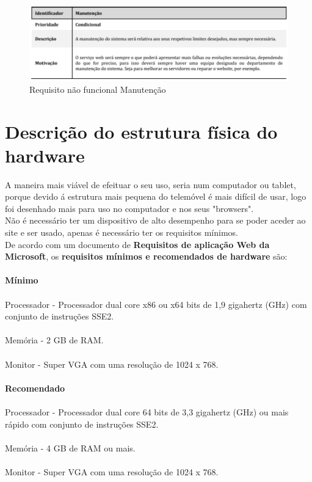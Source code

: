 \begin{figure}[H]
	\centering
	\includegraphics[width=15cm]{requisito_nao_funcional6}
	\caption{Requisito não funcional Manutenção}
	\label{fig:requisitonaofuncional6}
\end{figure}

\section{Descrição do estrutura física do hardware}
A maneira mais viável de efeituar o seu uso, seria num computador ou tablet, porque devido á estrutura mais pequena do telemóvel é mais difícil de usar, logo foi desenhado mais para uso no computador e nos seus "browsers". \\
Não é necessário ter um dispositivo de alto desempenho para se poder aceder ao site e ser usado, apenas é necessário ter os requisitos mínimos.\\
De acordo com um documento de \textbf{Requisitos de aplicação Web da Microsoft}, os \textbf{requisitos mínimos e recomendados de hardware} são:\\
\\ \textbf{Mínimo}\\
\\Processador - Processador dual core x86 ou x64 bits de 1,9 gigahertz (GHz) com conjunto de instruções SSE2.\\
\\Memória - 2 GB de RAM. \\
\\Monitor - Super VGA com uma resolução de 1024 x 768. \\
\\ \textbf{Recomendado}\\
\\Processador - Processador dual core 64 bits de 3,3 gigahertz (GHz) ou mais rápido com conjunto de instruções SSE2.\\
\\Memória - 4 GB de RAM ou mais.\\
\\Monitor - 	Super VGA com uma resolução de 1024 x 768.\\
